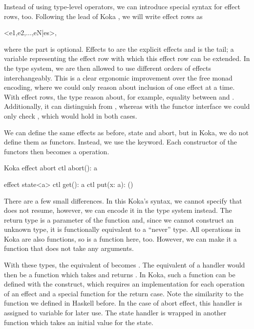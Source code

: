 Instead of using type-level operators, we can introduce special syntax for effect rows, too. Following the lead of Koka \autocite{leijen_koka_2014}, we will write effect rows as
\begin{center}{\ttfamily<e1,e2,...,eN|es>},\end{center}
where the  part is optional. Effects  to  are the explicit effects and  is the tail; a variable representing the effect row with which this effect row can be extended. In the type system, we are then allowed to use different orders of effects interchangeably. This is a clear ergonomic improvement over the free monad encoding, where we could only reason about inclusion of one effect at a time. With effect rows, the type reason about, for example, equality between  and . Additionally, it can distinguish  from , whereas with the functor interface we could only check , which would hold in both cases.

We can define the same effects as before, state and abort, but in Koka, we do not define them as functors. Instead, we use the  keyword. Each constructor of the functors then becomes a  operation.

\begin{lst}{Koka}
effect abort
  ctl abort(): a

effect state<a>
  ctl get(): a
  ctl put(x: a): ()
\end{lst}

There are a few small differences. In this Koka's syntax, we cannot specify that  does not resume, however, we can encode it in the type system instead. The return type  is a parameter of the function and, since we cannot construct an unknown type, it is functionally equivalent to a ``never'' type. All operations in Koka are also functions, so  is a function here, too. However, we can make it a function that does not take any arguments.

With these types, the equivalent of  becomes . The equivalent of a handler would then be a function which takes  and returns . In Koka, such a function can be defined with the  construct, which requires an implementation for each operation of an effect and a special function for the return case. Note the similarity to the  function we defined in Haskell before. In the case of abort effect, this handler is assigned to variable for later use. The state handler is wrapped in another function which takes an initial value for the state.

